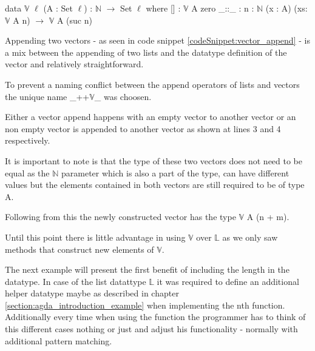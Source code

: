 \begin{codesnippet}[mathescape=true, caption={Definition of the vector datatype in Agda}, label={codeSnippet:vector_datatype}]
data $\mathbb{V}$ {$\ell$} (A : Set $\ell$) : $\mathbb{N}$ $\rightarrow$ Set $\ell$ where
  [] : $\mathbb{V}$ A zero
  _::_ : {n : $\mathbb{N}$} (x : A) (xs: $\mathbb{V}$ A n) $\rightarrow$
         $\mathbb{V}$ A (suc n)
\end{codesnippet}

Appending two vectors - as seen in code snippet \ref{codeSnippet:vector_append} - is a mix between the appending of two lists and the datatype definition of the vector and relatively straightforward.

To prevent a naming conflict between the append operators of lists and vectors the unique name \_++$\mathbb{V}$\_ was choosen.

Either a vector append happens with an empty vector to another vector or an non empty vector is appended to another vector as shown at lines 3 and 4 respectively.

It is important to note is that the type of these two vectors does not need to be equal as the $\mathbb{N}$ parameter which is also a part of the type, can have different values but the elements contained in both vectors are still required to be of type A.

Following from this the newly constructed vector has the type $\mathbb{V}$ A (n + m).
\begin{codesnippet}[mathescape=true, caption={Definition of the vector append function in Agda}, label={codeSnippet:vector_append}]
_++$\mathbb{V}$_ : $\forall$ {$\ell$} {A : Set $\ell$}  {n m: $\mathbb{N}$ $\rightarrow$
        $\mathbb{V}$ A n $\rightarrow \mathbb{V}$ A m $\rightarrow \mathbb{V}$ A (n + m)
  []        ++$\mathbb{V}$ ys = ys
  (x :: xs) ++$\mathbb{V}$ ys = x :: (xs ++$\mathbb{V}$ ys)
\end{codesnippet}

Until this point there is little advantage in using $\mathbb{V}$ over $\mathbb{L}$ as we only saw methods that construct new elements of $\mathbb{V}$.

The next example will present the first benefit of including the length in the datatype.
In case of the list datattype $\mathbb{L}$ it was required to define an additional helper datatype maybe as described in chapter \ref{section:agda_introduction_example} when implementing the nth function.
Additionally every time when using the function the programmer has to think of this different cases nothing or just and adjust his functionality - normally with additional pattern matching.

